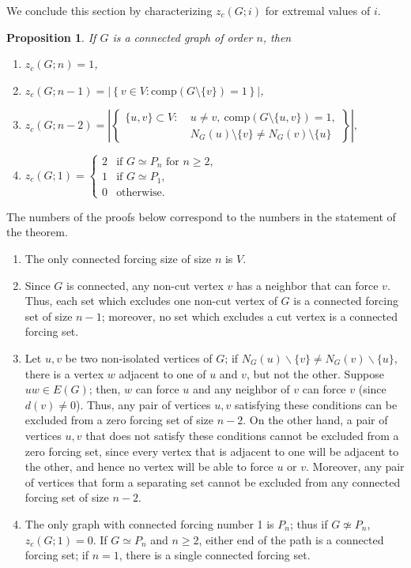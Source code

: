 \documentclass[11pt]{article}
\newtheorem{prop}[thm]{Proposition}
\theoremstyle{definition}
\newcommand{\comp}{\mathrm{comp}}
\newcommand{\1}{\vspace{0.1cm}}
\newcommand{\2}{\vspace{0.2cm}}
\newcommand{\3}{\vspace{0.3cm}}
\begin{document}
\noindent We conclude this section by characterizing $z_c(G;i)$ for extremal values of $i$.

\begin{prop}
\label{thm_zf_polynomial_properties}
If $G$ is a connected graph of order $n$, then
\begin{enumerate}
\item[\textup{(1)}] $z_c(G; n) = 1$,
\item[\textup{(2)}] $z_c(G; n-1) = \left|\left\{ v \in V : \comp(G \setminus \{v\}) = 1\right\}\right|$,
\item[\textup{(3)}] 
$
z_c(G; n-2) = \left| \left\{
\begin{aligned}
\{u, v\} \subset V :\ & u \ne v,\ \comp(G \setminus \{u, v\}) = 1, \\
& N_G(u) \setminus \{v\} \ne N_G(v) \setminus \{u\}
\end{aligned}
\right\} \right|,
$
\item[\textup{(4)}] 
$
z_c(G; 1) = 
\begin{cases}
2 & \text{if } G \simeq P_n \text{ for } n \ge 2, \\
1 & \text{if } G \simeq P_1, \\
0 & \text{otherwise}.
\end{cases}
$
\end{enumerate}
\end{prop}

\proof The numbers of the proofs below correspond to the numbers in the statement of the theorem. 
\begin{enumerate}
\item[(1)] The only connected forcing size of size $n$ is $V$.
\item[(2)] Since $G$ is connected, any non-cut vertex $v$ has a neighbor that can force $v$. Thus, each set which excludes one non-cut vertex of $G$ is a connected forcing set of size $n-1$; moreover, no set which excludes a cut vertex is a connected forcing set. 
\item[(3)] Let $u,v$ be two non-isolated vertices of $G$; if $N_G(u)\backslash\{v\}\neq N_G(v)\backslash\{u\}$, there is a vertex $w$ adjacent to one of $u$ and $v$, but not the other. Suppose $uw \in E(G)$; then, $w$ can force $u$ and any neighbor of $v$ can force $v$ (since $d(v)\neq 0$). Thus, any pair of vertices $u,v$ satisfying these conditions can be excluded from a zero forcing set of size $n-2$. On the other hand, a pair of vertices $u,v$ that does not satisfy these conditions cannot be excluded from a zero forcing set, since every vertex that is adjacent to one will be adjacent to the other, and hence no vertex will be able to force $u$ or $v$. Moreover, any pair of vertices that form a separating set cannot be excluded from any connected forcing set of size $n-2$.  
\item[(4)] The only graph with connected forcing number 1 is $P_n$; thus if $G\not\simeq P_n$, $z_c(G;1)=0$. If $G\simeq P_n$ and $n\geq 2$, either end of the path is a connected forcing set; if $n=1$, there is a single connected forcing set.
\end{enumerate}
\end{document}
